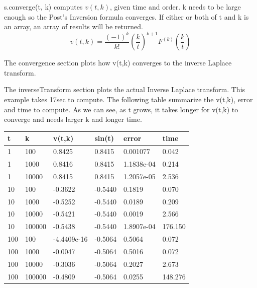 \documentclass[12pt]{article}
\begin{document}
s.converge(t, k) computes $v(t, k)$, given time and order. k needs to be large enough so the Post's Inversion formula converges.
If either or both of t and k is an array, an array of results will be returned.
\begin{equation*}
v(t, k) = \frac{(-1)^{k}}{k!} \left(\frac{k}{t}\right)^{k+1}  F^{(k)} \left(\frac{k}{t}\right)
\end{equation*}

The convergence section plots how v(t,k) converges to the inverse Laplace transform.

The inverseTransform section plots the actual Inverse Laplace transform. This example takes 17sec to compute.
The following table summarize the v(t,k), error and time to compute. As we can see, as t grows, it takes longer for v(t,k) to converge and needs larger k and longer time.

\begin{tabular}{| l | l | l | l | l | l |}
\hline
t  &  k   &  v(t,k) & sin(t) & error & time \\
\hline
1  &  100 &  0.8425 & 0.8415 & 0.001077 & 0.042 \\
\hline
1  &  1000 &  0.8416 & 0.8415 & 1.1838e-04 & 0.214 \\
\hline
1  &  10000 &  0.8415 & 0.8415 & 1.2057e-05 & 2.536 \\
\hline
10  &  100 &  -0.3622 & -0.5440 & 0.1819 & 0.070 \\
\hline
10  &  1000 &  -0.5252 & -0.5440 & 0.0189 & 0.209 \\
\hline
10  &  10000 &  -0.5421 & -0.5440 & 0.0019 & 2.566 \\
\hline
10  &  100000 &  -0.5438 & -0.5440 & 1.8907e-04 & 176.150\\
\hline
100  &  100 &  -4.4409e-16 & -0.5064 & 0.5064 & 0.072 \\
\hline
100  &  1000 &  -0.0047 & -0.5064 & 0.5016 & 0.072 \\
\hline
100  &  10000 &  -0.3036 & -0.5064 & 0.2027 & 2.673 \\
\hline
100  &  100000 &  -0.4809 & -0.5064 & 0.0255 & 148.276  \\
\hline
\end{tabular}

\clearpage

\end{document}
